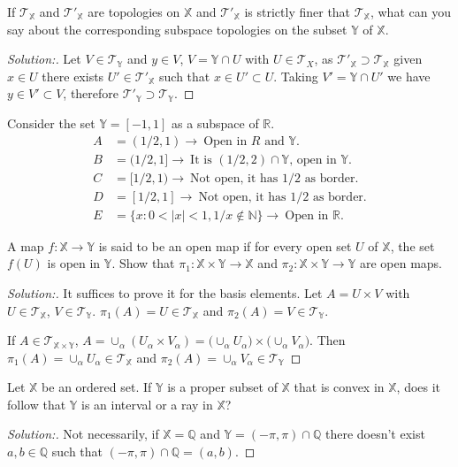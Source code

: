 \documentclass[a4paper,12pt, reqno]{article}
\theoremstyle{definition}
\newenvironment{exerr}[1]{
  \renewcommand\theexeralt{#1}
  \exeralt
}{\endexeralt}
\newenvironment{solution}{\begin{proof}[Solution:]}{\end{proof}}
\newcommand{\R}{\mathbb{R}}
\newcommand{\Q}{\mathbb{Q}}
\newcommand{\T}{\mathscr{T}}
\newcommand{\N}{\mathbb{N}}
\newcommand{\X}{\mathbb{X}}
\newcommand{\Y}{\mathbb{Y}}
\begin{document}
\begin{exerr}{2}
  If $\T_{\X}$ and $\T'_{\X}$ are topologies on $\X$ and $\T'_{\X}$ is strictly finer that $\T_{\X}$, what can you say about the corresponding subspace topologies on the subset $\Y$ of $\X$.
\end{exerr}
\begin{solution}
  Let $V\in\T_{\Y}$ and $y\in V$, $V = \Y\cap U$ with $U\in\T_{X}$, as $\T'_{\X}\supset\T_{\X}$ given $x\in U$ there exists $U'\in\T'_{\X}$ such that $x\in U'\subset U$. Taking $V' = \Y\cap U'$ we have $y\in V'\subset V$, therefore $\T'_{\Y}\supset\T_{\Y}$.
\end{solution}

\begin{exerr}{3}
  Consider the set $\Y = [-1,1]$ as a subspace of $\R$.
  \begin{align*}
    A & = (1/2,1)\rightarrow~\text{Open in $R$ and $\Y$}.                \\
    B & = (1/2,1]\rightarrow~\text{It is $(1/2,2)\cap\Y$, open in $\Y$}. \\
    C & = [1/2,1)\rightarrow~\text{Not open, it has $1/2$ as border}.    \\
    D & = [1/2,1]\rightarrow~\text{Not open, it has $1/2$ as border}.    \\
    E & = \{ x : 0<|x|<1, 1/x\notin\N \}\rightarrow~\text{Open in $\R$.}
  \end{align*}
\end{exerr}

\begin{exerr}{4}
  A map $f:\X\to\Y$ is said to be an open map if for every open set $U$ of $\X$, the set $f(U)$ is open in $\Y$. Show that $\pi_{1}:\X\times\Y\to\X$ and $\pi_{2}:\X\times\Y\to\Y$ are open maps.
\end{exerr}
\begin{solution}
  It suffices to prove it for the basis elements. Let $A = U\times V$ with $U\in\T_{\X}$, $V\in\T_{\Y}$.
  $\pi_{1}(A) = U\in\T_{\X}$ and $\pi_{2}(A) = V\in\T_{\Y}$.

  If $A\in\T_{\X\times\Y}$, $A = \cup_{\alpha}(U_{\alpha}\times V_{\alpha}) = \big( \cup_{\alpha}U_{\alpha} \big)\times\big( \cup_{\alpha}V_{\alpha} \big)$. Then $\pi_{1}(A) = \cup_{\alpha} U_{\alpha}\in\T_{\X}$ and $\pi_{2}(A) = \cup_{\alpha}V_{\alpha}\in\T_{\Y}$
\end{solution}

\begin{exerr}{7}
  Let $\X$ be an ordered set. If $\Y$ is a proper subset of $\X$ that is convex in $\X$, does it follow that $\Y$ is an interval or a ray in $\X$?
\end{exerr}
\begin{solution}
  Not necessarily, if $\X = \Q$ and $\Y = (-\pi,\pi)\cap\Q$ there doesn't exist $a,b\in\Q$ such that $(-\pi,\pi)\cap\Q = (a,b)$.
\end{solution}
\end{document}
